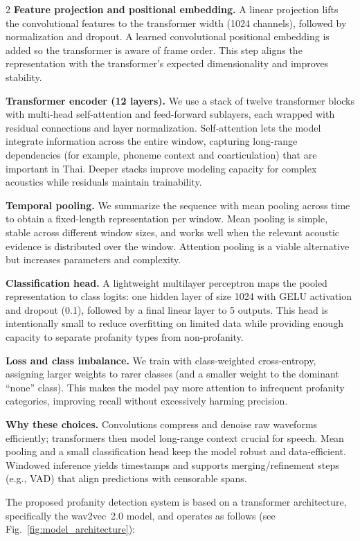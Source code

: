 \documentclass[11pt,a4paper]{article}
\begin{document}
\begin{multicols}{2}
	\textbf{Feature projection and positional embedding.} A linear projection lifts the convolutional features to the transformer width (1024 channels), followed by normalization and dropout. A learned convolutional positional embedding is added so the transformer is aware of frame order. This step aligns the representation with the transformer’s expected dimensionality and improves stability.

	\textbf{Transformer encoder (12 layers).} We use a stack of twelve transformer blocks with multi-head self-attention and feed-forward sublayers, each wrapped with residual connections and layer normalization. Self-attention lets the model integrate information across the entire window, capturing long-range dependencies (for example, phoneme context and coarticulation) that are important in Thai. Deeper stacks improve modeling capacity for complex acoustics while residuals maintain trainability.

	\textbf{Temporal pooling.} We summarize the sequence with mean pooling across time to obtain a fixed-length representation per window. Mean pooling is simple, stable across different window sizes, and works well when the relevant acoustic evidence is distributed over the window. Attention pooling is a viable alternative but increases parameters and complexity.

	\textbf{Classification head.} A lightweight multilayer perceptron maps the pooled representation to class logits: one hidden layer of size 1024 with GELU activation and dropout (0.1), followed by a final linear layer to 5 outputs. This head is intentionally small to reduce overfitting on limited data while providing enough capacity to separate profanity types from non-profanity.

	\textbf{Loss and class imbalance.} We train with class-weighted cross-entropy, assigning larger weights to rarer classes (and a smaller weight to the dominant “none” class). This makes the model pay more attention to infrequent profanity categories, improving recall without excessively harming precision.

	\textbf{Why these choices.} Convolutions compress and denoise raw waveforms efficiently; transformers then model long-range context crucial for speech. Mean pooling and a small classification head keep the model robust and data-efficient. Windowed inference yields timestamps and supports merging/refinement steps (e.g., VAD) that align predictions with censorable spans.

\noindent
	The proposed profanity detection system is based on a transformer architecture, specifically the wav2vec~2.0 model, and operates as follows (see Fig.~\ref{fig:model_architecture}):



\end{multicols}
\end{document}
